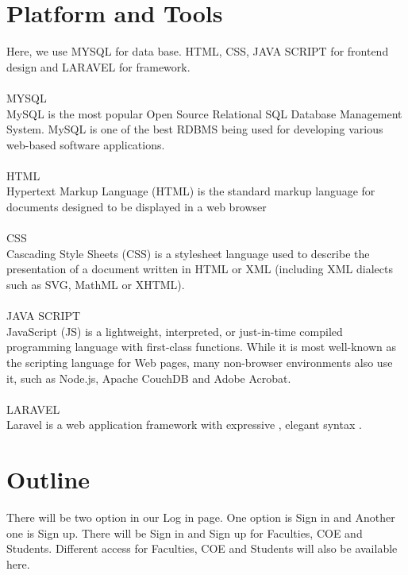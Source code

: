 \documentclass{article}
\begin{document}
\begin{titlepage}
\begin{figure}[h!]
\end{figure}

\vspace{10cm}

\section{Platform and Tools}\label{oject}

Here, we use MYSQL for data base. HTML, CSS, JAVA SCRIPT for frontend design and LARAVEL for framework.\\ \\
MYSQL\\
MySQL is the most popular Open Source Relational SQL Database Management System. MySQL is one of the best RDBMS being used for developing various web-based software applications.\\ \\
HTML \\
Hypertext Markup Language (HTML) is the standard markup language for documents designed to be displayed in a web browser\\ \\
CSS \\
Cascading Style Sheets (CSS) is a stylesheet language used to describe the presentation of a document written in HTML or XML (including XML dialects such as SVG, MathML or XHTML).\\ \\
JAVA SCRIPT\\
JavaScript (JS) is a lightweight, interpreted, or just-in-time compiled programming language with first-class functions. While it is most well-known as the scripting language for Web pages, many non-browser environments also use it, such as Node.js, Apache CouchDB and Adobe Acrobat. \\ \\
LARAVEL\\
Laravel is a web application framework with expressive , elegant syntax .



\section{Outline}\label{oject}

There will be two option in our Log in page. One option is Sign in and Another one is Sign up. There will be Sign in and Sign up for Faculties, COE and Students. Different access for Faculties, COE and Students will also be available here.


\end{titlepage}
\end{document}

